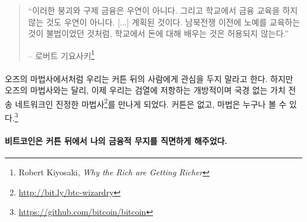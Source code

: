 \begin{quotation}\begin{samepage}
		\enquote{이러한 붕괴와 구제 금융은 우연이 아니다. 그리고 학교에서 금융 교육을 하지 않는 것도 우연이 아니다. [...] 계획된 것이다.
			남북전쟁 이전에 노예를 교육하는 것이 불법이었던 것처럼, 학교에서 돈에 대해 배우는 것은 허용되지 않는다.}
		\begin{flushright} -- 로버트 기요사키\footnote{Robert Kiyosaki, \textit{Why the Rich
					are Getting Richer}\cite{robert-kiyosaki}}
\end{flushright}\end{samepage}\end{quotation}


\paragraph{}
오즈의 마법사에서처럼 우리는 커튼 뒤의 사람에게 관심을 두지 말라고 한다. 
하지만 오즈의 마법사와는 달리, 이제 우리는 검열에 저항하는 개방적이며 국경 없는 가치 전송 네트워크인 진정한 마법사\footnote{\url{http://bit.ly/btc-wizardry}}를 만나게 되었다.
커튼은 없고, 마법은 누구나 볼 수 있다.\footnote{\url{https://github.com/bitcoin/bitcoin}}

\paragraph{비트코인은 커튼 뒤에서 나의 금융적 무지를 직면하게 해주었다.}

%
%
%
%
